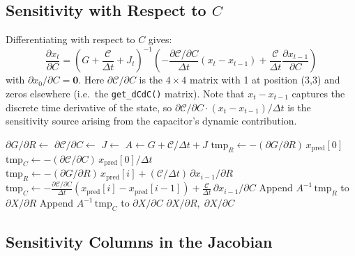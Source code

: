 \documentclass[journal,twocolumn]{IEEEtran}
\begin{document}
\subsection{Sensitivity with Respect to \texorpdfstring{$C$}{C}}

Differentiating with respect to $C$ gives:
\begin{equation}
\frac{\partial x_t}{\partial C} = \left(G + \frac{\mathcal{C}}{\Delta t} + J_t\right)^{-1}\!\!\left(-\frac{\partial\mathcal{C}/\partial C}{\Delta t}(x_t - x_{t-1}) + \frac{\mathcal{C}}{\Delta t}\frac{\partial x_{t-1}}{\partial C}\right)
\label{eq:sensC}
\end{equation}
with $\partial x_0/\partial C = \mathbf{0}$. Here $\partial\mathcal{C}/\partial C$ is the $4\times4$ matrix with 1 at position (3,3) and zeros elsewhere (i.e.\ the \texttt{get\_dCdC()} matrix). Note that $x_t - x_{t-1}$ captures the discrete time derivative of the state, so $\partial\mathcal{C}/\partial C \cdot (x_t-x_{t-1})/\Delta t$ is the sensitivity source arising from the capacitor's dynamic contribution.

\begin{algorithm}[H]
\caption{getSensitivities}
\begin{algorithmic}[1]
  \State $\partial G/\partial R \leftarrow$ 
  \State $\partial\mathcal{C}/\partial C \leftarrow$ 
    \State $J \leftarrow$ 
    \State $A \leftarrow G + \mathcal{C}/\Delta t + J$
      \State $\text{tmp}_R \leftarrow -(\partial G/\partial R)\,x_{\text{pred}}[0]$
      \State $\text{tmp}_C \leftarrow -(\partial\mathcal{C}/\partial C)\,x_{\text{pred}}[0]/\Delta t$
    \Else
      \State $\text{tmp}_R \leftarrow -(\partial G/\partial R)\,x_{\text{pred}}[i] + (\mathcal{C}/\Delta t)\,\partial x_{i-1}/\partial R$
      \State $\text{tmp}_C \leftarrow -\frac{\partial\mathcal{C}/\partial C}{\Delta t}(x_{\text{pred}}[i]-x_{\text{pred}}[i-1]) + \frac{\mathcal{C}}{\Delta t}\,\partial x_{i-1}/\partial C$
    \EndIf
    \State Append $A^{-1}\,\text{tmp}_R$ to $\partial X/\partial R$
    \State Append $A^{-1}\,\text{tmp}_C$ to $\partial X/\partial C$
  \EndFor
  \State \Return $\partial X/\partial R,\;\partial X/\partial C$
\EndFunction
\end{algorithmic}
\end{algorithm}

\subsection{Sensitivity Columns in the Jacobian}
\end{document}
